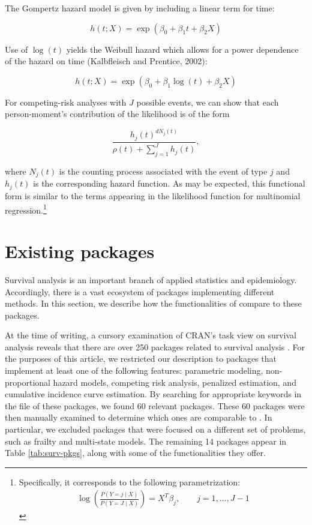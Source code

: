 \documentclass[
]{jss}
\begin{document}
The Gompertz hazard model is given by including a linear term for time:

\[ h(t;X)  = \exp(\beta_0 + \beta_1 t + \beta_2 X) \]

Use of \(\log(t)\) yields the Weibull hazard which allows for a power
dependence of the hazard on time (Kalbfleisch and Prentice, 2002):

\[ h(t;X)  = \exp(\beta_0 + \beta_1 \log(t) + \beta_2 X) \]

For competing-risk analyses with \(J\) possible events, we can show that
each person-moment's contribution of the likelihood is of the form

\[\frac{h_j(t)^{dN_j(t)}}{\rho(t) + \sum_{j=1}^Jh_j(t)},\]

where \(N_j(t)\) is the counting process associated with the event of
type \(j\) and \(h_j(t)\) is the corresponding hazard function. As may
be expected, this functional form is similar to the terms appearing in
the likelihood function for multinomial
regression.\footnote{Specifically, it corresponds to the following parametrization: \begin{align*} \log\left(\frac{P(Y=j \mid X)}{P(Y = J \mid X)}\right) = X^T\beta_j, \qquad j = 1,\ldots, J-1\end{align*}}

\hypertarget{existing-packages}{%
\section{Existing packages}\label{existing-packages}}

Survival analysis is an important branch of applied statistics and
epidemiology. Accordingly, there is a vast ecosystem of 
packages implementing different methods. In this section, we describe
how the functionalities of  compare to these packages.

At the time of writing, a cursory examination of CRAN's task view on
survival analysis reveals that there are over 250 packages related to
survival analysis \citeyearpar{survTaskView}. For the purposes of this
article, we restricted our description to packages that implement at
least one of the following features: parametric modeling,
non-proportional hazard models, competing risk analysis, penalized
estimation, and cumulative incidence curve estimation. By searching for
appropriate keywords in the  file of these packages,
we found 60 relevant packages. These 60 packages were then manually
examined to determine which ones are comparable to . In
particular, we excluded packages that were focused on a different set of
problems, such as frailty and multi-state models. The remaining 14
packages appear in Table \ref{tab:surv-pkgs}, along with some of the
functionalities they offer.
\end{document}

